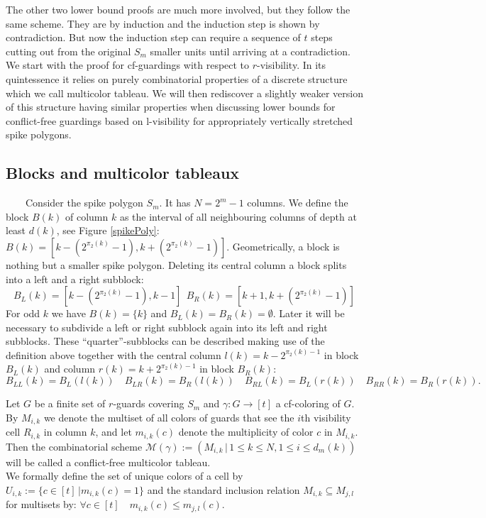 \documentclass[a4paper,USenglish,numberwithinsect]{lipics}
\theoremstyle{plain}
\begin{document}
The other two lower bound proofs  are much more involved, but they follow the same scheme. They are by induction and the induction step is shown by contradiction. 
But now the  induction step  
can require a sequence of $t$  steps cutting out from  the original $S_m$
 smaller units 
until arriving at a contradiction. We start with the proof  for
cf-guardings
with respect to $r$-visibility. In its quintessence  
 it  relies on purely combinatorial properties of a  discrete structure which we call multicolor tableau.
We will then rediscover a slightly  weaker version of this structure having similar  properties when discussing lower bounds for conflict-free guardings
based on  l-visibility
for appropriately vertically stretched spike polygons.

 
 
\subsection{Blocks and multicolor tableaux}
\ \ \ \ Consider the spike polygon $S_m$. It has $N=2^m-1$ columns.
We define the block $B(k)$ of column $k$ as the interval
of all neighbouring columns of depth at least $d(k)$, see Figure \ref{spikePoly}: \\
 $B(k)= \left[k-\left(2^{\pi_2(k)}-1 \right), k+  \left(2^{\pi_2(k)}-1 \right)\right]$. Geometrically, a block is nothing but a smaller spike polygon. Deleting its central column a block splits into a left and a right subblock: \\
$$
 B_L(k)= \left[k-\left(2^{\pi_2(k)}-1 \right), k-1\right] \ \
 B_R(k)= \left[k+1, k+  \left(2^{\pi_2(k)}-1 \right)\right]$$
For odd $k$ we have $B(k)=\{k\}$ and $B_L(k) = B_R(k)= \emptyset$.
Later  it will be necessary to subdivide a left
or right subblock again into
its left and right subblocks. These ``quarter''-subblocks can be described
making use of the definition above
together with the central column $l(k)=k-2^{\pi_2(k)-1}$ in block
$B_L(k)$ and column
$r(k)=k+2^{\pi_2(k)-1}$ in  block $B_R(k)$:\\
\[
B_{LL}(k) = B_L(l(k)) \quad   B_{LR}(k) = B_R(l(k))  \quad
B_{RL}(k) = B_L(r(k))  \quad B_{RR}(k) = B_R(r(k)).
\]


Let $G$ be a finite set of $r$-guards covering $S_m$ and
$\gamma : G \rightarrow [t]$
a cf-coloring of  $G$. By  $M_{i,k}$ we denote the  multiset of
all colors of guards that see the $i$th
visibility cell $R_{i,k}$ in column $k$, and let $m_{i,k}(c)$ denote the
multiplicity of color $c$ in  $M_{i,k}$.
Then the  combinatorial scheme
${\mathcal M}(\gamma):=\left(M_{i,k} \, | \, 1 \leq k \leq N,  1 \leq i
\leq d_m(k) \right)$
will be called a conflict-free multicolor tableau.
\\
We
formally define   the set of unique colors of a cell by $U_{i,k} := \{ c \in [t] \, | m_{i,k}(c)=1\} $ and the  standard inclusion relation $M_{i,k} \subseteq M_{j,l}$ for multisets  by:
              $\forall c \in [t] \quad  m_{i,k}(c) \leq m_{j,l}(c)$.
\end{document}
